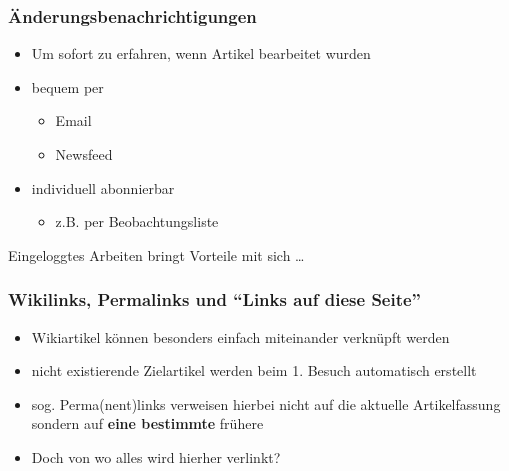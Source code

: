 \documentclass{beamer}
\begin{document}
\begin{frame}
  \frametitle{Änderungsbenachrichtigungen}

  \onslide<+->
  
  \begin{itemize}[<+->]
  \item Um sofort zu erfahren, wenn Artikel bearbeitet wurden
  \item bequem per
    \begin{itemize}
    \item Email
    \item Newsfeed
    \end{itemize}
  \item individuell abonnierbar
    \begin{itemize}
    \item z.B. per Beobachtungsliste
    \end{itemize}
  \end{itemize}

  \onslide<+->
  
  Eingeloggtes Arbeiten bringt Vorteile mit sich \dots
\end{frame}

\begin{frame}
  \frametitle{Wikilinks, Permalinks und “Links auf diese Seite”}
  
  \begin{itemize}[<+->]
  \item Wikiartikel können besonders einfach miteinander verknüpft werden
  \item nicht existierende Zielartikel werden beim 1. Besuch automatisch
    erstellt
  \item sog. Perma(nent)links verweisen hierbei nicht auf die aktuelle
    Artikelfassung sondern auf \textbf{eine bestimmte} frühere
  \item Doch von wo alles wird hierher verlinkt?
  \end{itemize}
  
\end{frame}
\end{document}
